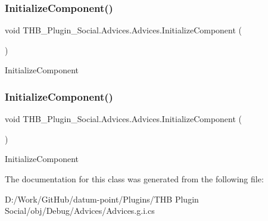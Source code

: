 \subsubsection{\texorpdfstring{Initialize\+Component()}{InitializeComponent()}\hspace{0.1cm}{\footnotesize\ttfamily [1/2]}}
{\footnotesize\ttfamily void T\+H\+B\+\_\+\+Plugin\+\_\+\+Social.\+Advices.\+Advices.\+Initialize\+Component (\begin{DoxyParamCaption}{ }\end{DoxyParamCaption})}



Initialize\+Component 

\mbox{\label{class_t_h_b___plugin___social_1_1_advices_1_1_advices_a270ffdf24c38f6c886996ff608b940a2}} 
\subsubsection{\texorpdfstring{Initialize\+Component()}{InitializeComponent()}\hspace{0.1cm}{\footnotesize\ttfamily [2/2]}}
{\footnotesize\ttfamily void T\+H\+B\+\_\+\+Plugin\+\_\+\+Social.\+Advices.\+Advices.\+Initialize\+Component (\begin{DoxyParamCaption}{ }\end{DoxyParamCaption})}



Initialize\+Component 



The documentation for this class was generated from the following file\+:\begin{DoxyCompactItemize}
\item 
D\+:/\+Work/\+Git\+Hub/datum-\/point/\+Plugins/\+T\+H\+B Plugin Social/obj/\+Debug/\+Advices/Advices.\+g.\+i.\+cs\end{DoxyCompactItemize}
